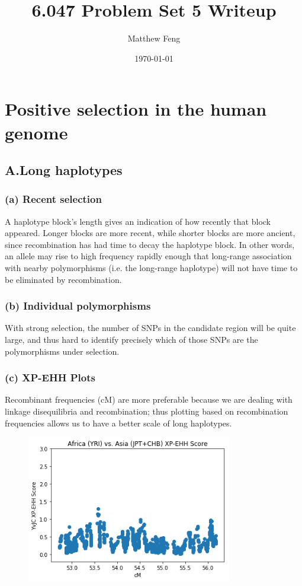 \documentclass{article}[11pt]
\title{6.047 Problem Set 5 Writeup}
\author{Matthew Feng}
\date{\today}
\begin{document}
\maketitle

\section{Positive selection in the human genome}
\subsection*{A.\quad Long haplotypes}
\subsubsection*{(a) Recent selection}
A haplotype block's length gives an indication of 
how recently that block appeared. Longer blocks
are more recent, while shorter blocks are more ancient,
since recombination has had time to decay the
haplotype block. In other words, an allele may rise
to high frequency rapidly enough that
long-range association with
nearby polymorphisms (i.e. the long-range haplotype)
will not have time to be eliminated by recombination.

\subsubsection*{(b) Individual polymorphisms}
With strong selection, the number of SNPs in the
candidate region will be quite large, and thus hard
to identify precisely which of those SNPs are the
polymorphisms under selection.

\subsubsection*{(c) XP-EHH Plots}
Recombinant frequencies (cM) are more preferable
because we are dealing with linkage disequilibria
and recombination; thus plotting based on
recombination frequencies allows us to have a
better scale of long haplotypes.

\begin{figure}[H]
    \includegraphics[width=0.8\textwidth]{problem1/yvjc.png}
\end{figure}
\end{document}

